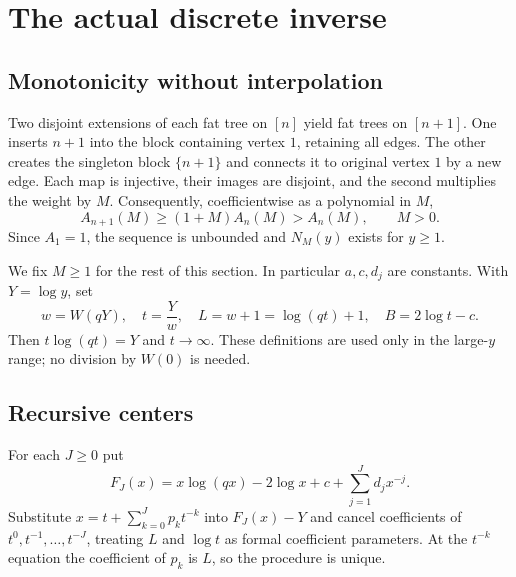 \documentclass[11pt,letterpaper]{article}
\numberwithin{equation}{section}
\theoremstyle{remark}\newtheorem{remark}[theorem]{Remark}
\begin{document}
\section{The actual discrete inverse}\label{fat:sec:inverse}
\subsection{Monotonicity without interpolation}
Two disjoint extensions of each fat tree on $[n]$ yield fat trees on $[n+1]$. One inserts $n+1$ into the block containing vertex $1$, retaining all edges. The other creates the singleton block $\{n+1\}$ and connects it to original vertex $1$ by a new edge. Each map is injective, their images are disjoint, and the second multiplies the weight by $M$. Consequently, coefficientwise as a polynomial in $M$,
\begin{equation}\label{fat:eq:monotone}
 A_{n+1}(M)\ge(1+M)A_n(M)>A_n(M),\qquad M>0.
\end{equation}
Since $A_1=1$, the sequence is unbounded and $N_M(y)$ exists for $y\ge1$.

We fix $M\ge1$ for the rest of this section. In particular $a,c,d_j$ are constants. With $Y=\log y$, set
\begin{equation}\label{fat:eq:Lambert}
 w=W(qY),\quad t=\frac{Y}{w},\quad
 L=w+1=\log(qt)+1,\quad B=2\log t-c.
\end{equation}
Then $t\log(qt)=Y$ and $t\to\infty$. These definitions are used only in the large-$y$ range; no division by $W(0)$ is needed.

\subsection{Recursive centers}
For each $J\ge0$ put
\[
 F_J(x)=x\log(qx)-2\log x+c+\sum_{j=1}^{J}d_jx^{-j}.
\]
Substitute $x=t+\sum_{k=0}^{J}p_kt^{-k}$ into $F_J(x)-Y$ and cancel coefficients of $t^0,t^{-1},\ldots,t^{-J}$, treating $L$ and $\log t$ as formal coefficient parameters. At the $t^{-k}$ equation the coefficient of $p_k$ is $L$, so the procedure is unique.
\end{document}
